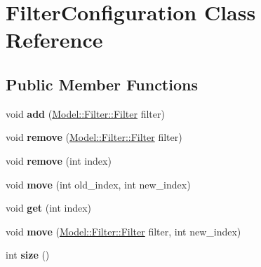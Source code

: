 \hypertarget{classUtility_1_1FilterConfiguration}{}\section{Filter\+Configuration Class Reference}
\label{classUtility_1_1FilterConfiguration}
\subsection*{Public Member Functions}
\begin{DoxyCompactItemize}
\item 
\hypertarget{classUtility_1_1FilterConfiguration_a961d33cf4200d7e889fac29580a7a45c}{}void {\bfseries add} (\hyperlink{classModel_1_1Filter_1_1Filter}{Model\+::\+Filter\+::\+Filter} filter)\label{classUtility_1_1FilterConfiguration_a961d33cf4200d7e889fac29580a7a45c}

\item 
\hypertarget{classUtility_1_1FilterConfiguration_a0c24c51c667bd54fca9b846ec146c554}{}void {\bfseries remove} (\hyperlink{classModel_1_1Filter_1_1Filter}{Model\+::\+Filter\+::\+Filter} filter)\label{classUtility_1_1FilterConfiguration_a0c24c51c667bd54fca9b846ec146c554}

\item 
\hypertarget{classUtility_1_1FilterConfiguration_a2ad1aa316f278b2e9fa8121504749652}{}void {\bfseries remove} (int index)\label{classUtility_1_1FilterConfiguration_a2ad1aa316f278b2e9fa8121504749652}

\item 
\hypertarget{classUtility_1_1FilterConfiguration_a0450480f09d1be88829cbeae2f5fdcae}{}void {\bfseries move} (int old\+\_\+index, int new\+\_\+index)\label{classUtility_1_1FilterConfiguration_a0450480f09d1be88829cbeae2f5fdcae}

\item 
\hypertarget{classUtility_1_1FilterConfiguration_a1bd4d5af67ddd1970c0d95fd3a27d00e}{}void {\bfseries get} (int index)\label{classUtility_1_1FilterConfiguration_a1bd4d5af67ddd1970c0d95fd3a27d00e}

\item 
\hypertarget{classUtility_1_1FilterConfiguration_ac7bd2badb395943efa7b14807727f6d2}{}void {\bfseries move} (\hyperlink{classModel_1_1Filter_1_1Filter}{Model\+::\+Filter\+::\+Filter} filter, int new\+\_\+index)\label{classUtility_1_1FilterConfiguration_ac7bd2badb395943efa7b14807727f6d2}

\item 
\hypertarget{classUtility_1_1FilterConfiguration_af4b57d21919c42d55af03391f91a1c08}{}int {\bfseries size} ()\label{classUtility_1_1FilterConfiguration_af4b57d21919c42d55af03391f91a1c08}

\end{DoxyCompactItemize}
